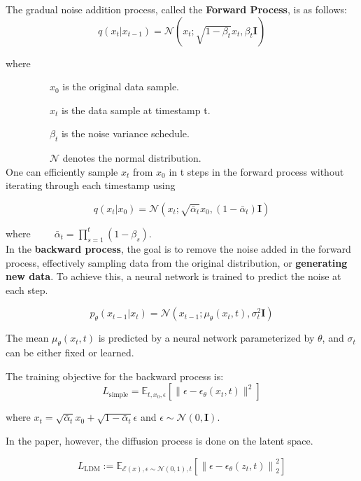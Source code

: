\documentclass{article}
\begin{document}
The gradual noise addition process, called the \textbf{Forward Process}, is as follows:
\[q(x_t | x_{t-1}) = \mathcal{N}(x_t; \sqrt{1 - \beta_t} x_t, \beta_t \mathbf{I})\]

where
\item $\hspace{50pt}$ $x_0$ is the original data sample.
\item $\hspace{50pt}$ $x_t$ is the data sample at timestamp t.
\item $\hspace{50pt}$ $\beta_t$ is the noise variance schedule.
\item $\hspace{50pt}$ $\mathcal{N}$ denotes the normal distribution. \\

One can efficiently sample $x_t$ from $x_0$ in t steps in the forward process without iterating through each timestamp using

\[q(x_t | x_0) = \mathcal{N}(x_t; \sqrt{\bar{\alpha}_t} x_0, (1 - \bar{\alpha}_t) \mathbf{I})\]

where \( \hspace{25pt} \bar{\alpha}_t = \prod_{s=1}^{t} (1 - \beta_s) \). \\

In the \textbf{backward process}, the goal is to remove the noise added in the forward process, effectively sampling data from the original distribution, or \textbf{generating new data}. To achieve this, a neural network is trained to predict the noise at each step. 

\[p_\theta(x_{t-1} | x_t) = \mathcal{N}(x_{t-1}; \mu_\theta(x_t, t), \sigma^2_t \mathbf{I})\]

The mean \(\mu_\theta(x_t, t)\) is predicted by a neural network parameterized by \(\theta\), and \(\sigma_t\) can be either fixed or learned.

The training objective for the backward process is:
\[L_{\text{simple}} = \mathbb{E}_{t, x_0, \epsilon} \left[ \|\epsilon - \epsilon_\theta(x_t, t) \|^2 \right]\]

where \( x_t = \sqrt{\bar{\alpha}_t} x_0 + \sqrt{1 - \bar{\alpha}_t} \epsilon \) and \(\epsilon \sim \mathcal{N}(0, \mathbf{I})\).

In the paper, however, the diffusion process is done on the latent space.

\begin{equation}
L_{\text{LDM}} := \mathbb{E}_{\mathcal{E}(x), \epsilon \sim \mathcal{N}(0,1), t} \left[ \left\| \epsilon - \epsilon_{\theta}(z_t, t) \right\|^2_2 \right]
\end{equation}
\end{document}
